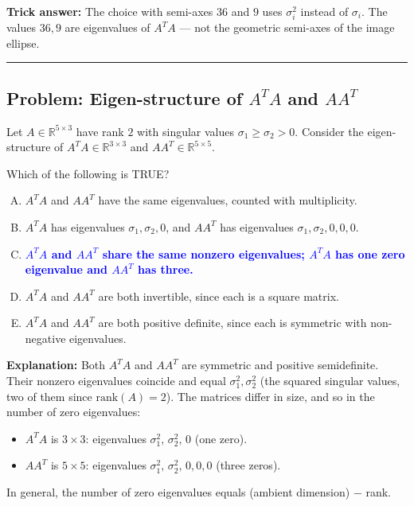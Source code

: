 \documentclass[12pt]{amsart}
\newcommand{\divider}{
  \vspace{-1em}
  \noindent
  \raisebox{-0.15ex}{\textbullet}%
  \hspace{0.5em}%
  \rule[0.5ex]{0.95\textwidth}{1.0pt}%
  \hspace{0.5em}%
  \raisebox{-0.15ex}{\textbullet}%
  \vspace{0em}
}
\begin{document}
\textbf{Trick answer:}
The choice with semi-axes $36$ and $9$ uses $\sigma_i^2$ instead of $\sigma_i$.
The values $36, 9$ are eigenvalues of $A^TA$ --- not the geometric semi-axes
of the image ellipse.

\divider

\subsection*{Problem: Eigen-structure of $A^TA$ and $AA^T$}

Let $A \in \mathbb{R}^{5 \times 3}$ have rank $2$ with singular values
$\sigma_1 \geq \sigma_2 > 0$. Consider the eigen-structure of
$A^TA \in \mathbb{R}^{3 \times 3}$ and $AA^T \in \mathbb{R}^{5 \times 5}$.

Which of the following is TRUE?

\begin{enumerate}[(A)]
\item $A^TA$ and $AA^T$ have the same eigenvalues, counted with multiplicity.
\item $A^TA$ has eigenvalues $\sigma_1, \sigma_2, 0$, and $AA^T$ has eigenvalues
$\sigma_1, \sigma_2, 0, 0, 0$.
\item \textcolor{blue}{\textbf{$A^TA$ and $AA^T$ share the same nonzero eigenvalues; $A^TA$ has one zero eigenvalue and $AA^T$ has three.}}
\item $A^TA$ and $AA^T$ are both invertible, since each is a square matrix.
\item $A^TA$ and $AA^T$ are both positive definite, since each is symmetric with
non-negative eigenvalues.
\end{enumerate}

\textbf{Explanation:}
Both $A^TA$ and $AA^T$ are symmetric and positive semidefinite. Their nonzero
eigenvalues coincide and equal $\sigma_1^2, \sigma_2^2$ (the squared singular
values, two of them since $\mathrm{rank}(A) = 2$). The matrices differ in size,
and so in the number of zero eigenvalues:
\begin{itemize}
\item $A^TA$ is $3\times 3$: eigenvalues $\sigma_1^2,\, \sigma_2^2,\, 0$ (one zero).
\item $AA^T$ is $5\times 5$: eigenvalues $\sigma_1^2,\, \sigma_2^2,\, 0, 0, 0$ (three zeros).
\end{itemize}
In general, the number of zero eigenvalues equals (ambient dimension) $-$ rank.
\end{document}
